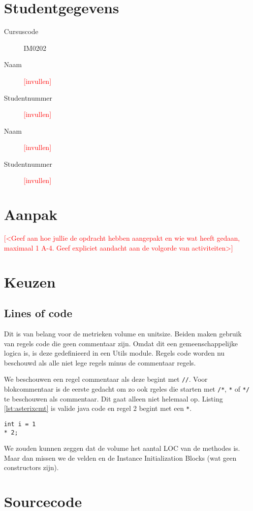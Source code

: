 \documentclass[a4paper]{article}
\newcommand{\todo}[1]{\textcolor{red}{[#1]}}
\begin{document}
\pagestyle{fancy}

\section*{Studentgegevens}
\begin{description}
	\item [Cursuscode] IM0202
	\item [Naam] \todo{invullen}
	\item [Studentnummer] \todo{invullen}
	\item [Naam] \todo{invullen}
	\item [Studentnummer] \todo{invullen}
\end{description}

\section*{Aanpak}
\todo{<Geef aan hoe jullie de opdracht hebben aangepakt en wie wat heeft gedaan, maximaal 1 A-4. Geef expliciet aandacht aan de volgorde van activiteiten>}



\section{Keuzen}
\subsection{Lines of code}
Dit is van belang voor de metrieken volume en unitsize. Beiden maken gebruik van regels code die geen commentaar zijn. Omdat dit een gemeenschappelijke logica is, is deze gedefinieerd in een Utils module.
Regels code worden nu beschouwd als alle niet lege regels minus de commentaar regels.

We beschouwen een regel commentaar als deze begint met \lstinline{//}. Voor blokcommentaar is de eerste gedacht om zo ook rgeles die starten met \lstinline{/*}, \lstinline{*} of \lstinline{*/} te beschouwen als commentaar. Dit gaat alleen niet helemaal op. Listing \ref{lst:asterixcmt} is valide java code en regel 2 begint met een \lstinline{*}.

\begin{lstlisting}[caption={* als commentaar beschouwen},label={lst:asterixcmt},escapechar=|, frame = single]
int i = 1
* 2;
\end{lstlisting}

We zouden kunnen zeggen dat de volume het aantal LOC van de methodes is. Maar dan missen we de velden en de Instance Initialization Blocks (wat geen constructors zijn).



\section{Sourcecode}
\end{document}
